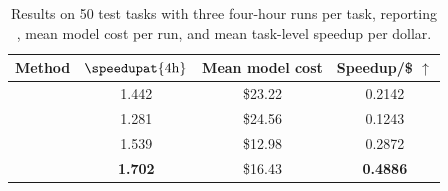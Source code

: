 \begin{table}[t]
  \centering
  \small
  \setlength{\tabcolsep}{5pt}
  \caption{Results on 50 test tasks with three four-hour runs per task, reporting , mean model cost per run, and mean task-level speedup per dollar.}
  \label{tab:boxbox-main-results}
  \begin{tabular}{lccc}
    \toprule
    Method & \(\speedupat{4\mathrm{h}}\) &
    Mean model cost & Speedup/\$ $\uparrow$ \\
    \midrule
    \frozen{}  & 1.442 & \$23.22 & 0.2142 \\
    \he{}      & 1.281 & \$24.56 & 0.1243 \\
    \hs{}      & 1.539 & \$12.98 & 0.2872 \\
    \boxbox{}       & \textbf{1.702} & \$16.43 & \textbf{0.4886} \\
    \bottomrule
  \end{tabular}
\end{table}
